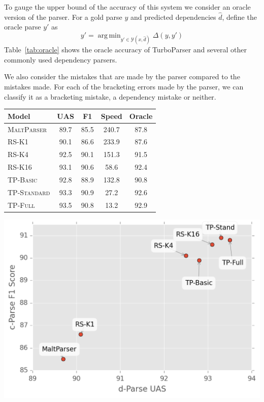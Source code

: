 \documentclass[11pt,letterpaper]{article}
\DeclareMathOperator*{\argmin}{arg\,min}
\begin{document}
To gauge the upper bound of the accuracy of this system we consider an oracle version of the parser. For a gold parse $y$ and predicted dependencies $\hat{d}$,  define the oracle parse $y'$ as
\[ y' = \argmin_{y' \in \mathcal{Y}(x, \hat{d})} \Delta(y, y') \]
\noindent Table~\ref{tab:oracle} shows the oracle accuracy of TurboParser and several other commonly used dependency parsers.

We also consider the mistakes that are made by the parser compared to the
mistakes made. For each of the bracketing errors made by the parser, we can classify it as a bracketing mistake, a dependency mistake or neither.

\begin{table}
  \centering
  \small

  \begin{tabular}{|l|cccc|}
    \hline
    Model & UAS  & F1 & Speed  & Oracle  \\
    \hline

    \hline
    \textsc{MaltParser}  & 89.7 & 85.5 & 240.7& 87.8 \\
    \textsc{RS-K1}       & 90.1 & 86.6 & 233.9& 87.6 \\
    \textsc{RS-K4}       & 92.5 & 90.1 & 151.3& 91.5 \\
    \textsc{RS-K16}      & 93.1 & 90.6 & 58.6 & 92.4 \\
    \textsc{TP-Basic}    & 92.8 & 88.9 & 132.8& 90.8 \\
    \textsc{TP-Standard} & 93.3 & 90.9 & 27.2 & 92.6 \\
    \textsc{TP-Full}     & 93.5 & 90.8 & 13.2 & 92.9 \\
    \hline
  \end{tabular}

  \includegraphics[scale=0.4]{../notebooks/parsers}


\end{table}
\end{document}
